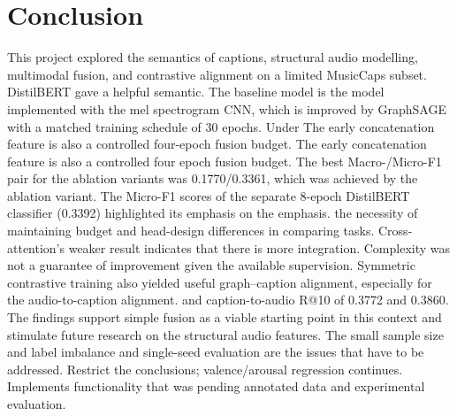 \documentclass[10pt,twocolumn,letterpaper]{article}
\begin{document}
\section{Conclusion}
This project explored the semantics of captions, structural audio modelling, multimodal fusion, and contrastive alignment on a limited MusicCaps subset. DistilBERT gave a helpful semantic. The baseline model is the model implemented with the mel spectrogram CNN, which is improved by GraphSAGE with a matched training schedule of 30 epochs. Under The early concatenation feature is also a controlled four-epoch fusion budget. The early concatenation feature is also a controlled four epoch fusion budget. The best Macro-/Micro-F1 pair for the ablation variants was 0.1770/0.3361, which was achieved by the ablation variant. The Micro-F1 scores of the separate 8-epoch DistilBERT classifier (0.3392) highlighted its emphasis on the emphasis. the necessity of maintaining budget and head-design differences in comparing tasks. Cross-attention's weaker result indicates that there is more integration. Complexity was not a guarantee of improvement given the available supervision. Symmetric contrastive training also yielded useful graph--caption alignment, especially for the audio-to-caption alignment. and caption-to-audio R@10 of 0.3772 and 0.3860. The findings support simple fusion as a viable starting point in this context and stimulate future research on the structural audio features. The small sample size and label imbalance and single-seed evaluation are the issues that have to be addressed. Restrict the conclusions; valence/arousal regression continues. Implements functionality that was pending annotated data and experimental evaluation.
\end{document}
